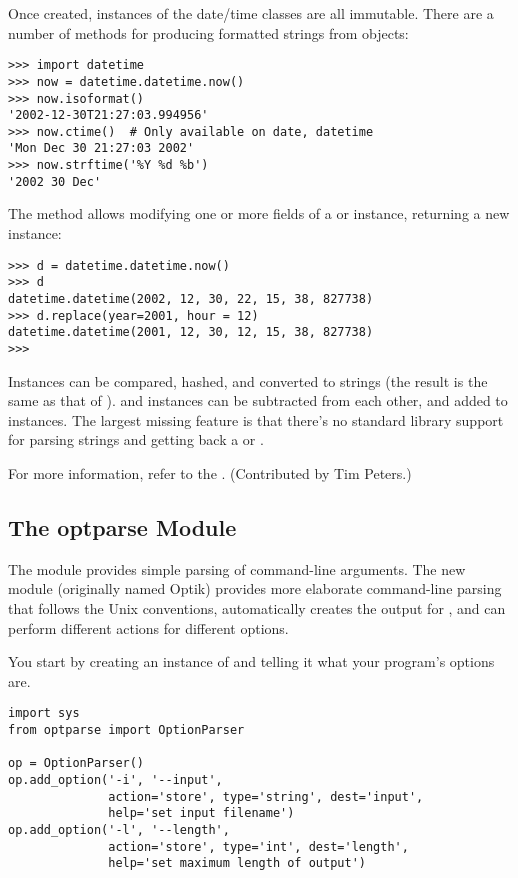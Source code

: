 \documentclass{howto}
\begin{document}
Once created, instances of the date/time classes are all immutable.
There are a number of methods for producing formatted strings from
objects:

\begin{verbatim}
>>> import datetime
>>> now = datetime.datetime.now()
>>> now.isoformat()
'2002-12-30T21:27:03.994956'
>>> now.ctime()  # Only available on date, datetime
'Mon Dec 30 21:27:03 2002'
>>> now.strftime('%Y %d %b')
'2002 30 Dec'
\end{verbatim}

The  method allows modifying one or more fields 
of a  or  instance, returning a new instance:

\begin{verbatim}
>>> d = datetime.datetime.now()
>>> d
datetime.datetime(2002, 12, 30, 22, 15, 38, 827738)
>>> d.replace(year=2001, hour = 12)
datetime.datetime(2001, 12, 30, 12, 15, 38, 827738)
>>>
\end{verbatim}

Instances can be compared, hashed, and converted to strings (the
result is the same as that of ).   and
 instances can be subtracted from each other, and
added to  instances.  The largest missing feature is
that there's no standard library support for parsing strings and getting back a
 or .

For more information, refer to the .
(Contributed by Tim Peters.)


\subsection{The optparse Module}

The  module provides simple parsing of command-line
arguments.  The new  module (originally named Optik)
provides more elaborate command-line parsing that follows the Unix
conventions, automatically creates the output for ,
and can perform different actions for different options.

You start by creating an instance of  and telling
it what your program's options are.

\begin{verbatim}
import sys
from optparse import OptionParser

op = OptionParser()
op.add_option('-i', '--input',
              action='store', type='string', dest='input',
              help='set input filename')
op.add_option('-l', '--length',
              action='store', type='int', dest='length',
              help='set maximum length of output')
\end{verbatim}
\end{document}
